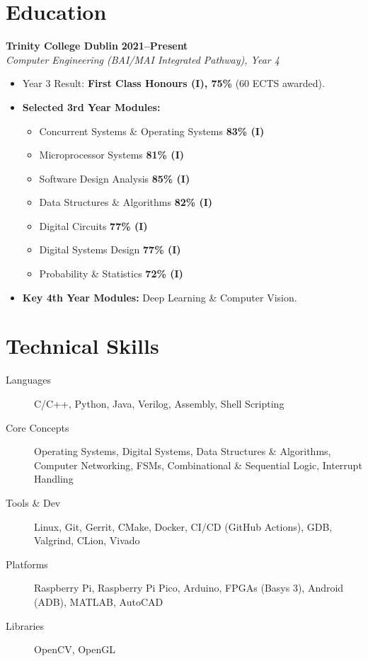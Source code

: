 \documentclass[10pt,a4paper]{article}
\begin{document}
\section*{Education}
\textbf{Trinity College Dublin} \hfill \textbf{2021--Present} \\
\textit{Computer Engineering (BAI/MAI Integrated Pathway), Year 4}
\begin{itemize}
    \item Year 3 Result: \textbf{First Class Honours (I), 75\%} (60 ECTS awarded).
    \item \textbf{Selected 3rd Year Modules:}
    \begin{itemize}[label={}, leftmargin=1em]
        \item Concurrent Systems \& Operating Systems \hfill \textbf{83\% (I)}
        \item Microprocessor Systems \hfill \textbf{81\% (I)}
        \item Software Design Analysis \hfill \textbf{85\% (I)}
        \item Data Structures \& Algorithms \hfill \textbf{82\% (I)}
        \item Digital Circuits \hfill \textbf{77\% (I)}
        \item Digital Systems Design \hfill \textbf{77\% (I)}
        \item Probability \& Statistics \hfill \textbf{72\% (I)}
    \end{itemize}
    \item \textbf{Key 4th Year Modules:} Deep Learning \& Computer Vision.
\end{itemize}


\section*{Technical Skills}
\begin{description}
    \item[Languages] C/C++, Python, Java, Verilog, Assembly, Shell Scripting
    \item[Core Concepts] Operating Systems, Digital Systems, Data Structures \& Algorithms, Computer Networking, FSMs, Combinational \& Sequential Logic, Interrupt Handling
    \item[Tools \& Dev] Linux, Git, Gerrit, CMake, Docker, CI/CD (GitHub Actions), GDB, Valgrind, CLion, Vivado
    \item[Platforms] Raspberry Pi, Raspberry Pi Pico, Arduino, FPGAs (Basys 3), Android (ADB), MATLAB, AutoCAD
    \item[Libraries] OpenCV, OpenGL
\end{description}
\end{document}

